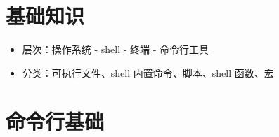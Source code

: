 \documentclass[]{book}
\providecommand{\tightlist}{%
  \setlength{\itemsep}{0pt}\setlength{\parskip}{0pt}}
\begin{document}
\hypertarget{ux57faux7840ux77e5ux8bc6}{%
\section{基础知识}\label{ux57faux7840ux77e5ux8bc6}}

\begin{itemize}
\tightlist
\item
  层次：操作系统 - shell - 终端 - 命令行工具
\item
  分类：可执行文件、shell 内置命令、脚本、shell 函数、宏
\end{itemize}

\hypertarget{ux547dux4ee4ux884cux57faux7840}{%
\section{命令行基础}\label{ux547dux4ee4ux884cux57faux7840}}
\end{document}
